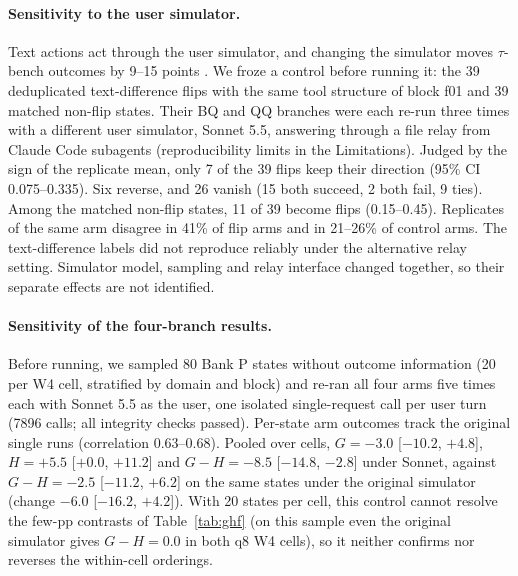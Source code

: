 \paragraph{Sensitivity to the user simulator.} Text actions act through the user simulator, and changing the simulator moves $\tau$-bench outcomes by 9--15 points \citep{seshadri2026lost,jain2026userproxybench}. %
We froze a control before running it: the 39 deduplicated text-difference flips with the same tool structure of block f01 and 39 matched non-flip states. Their BQ and QQ branches were each re-run three times with a different user simulator, Sonnet 5.5, answering through a file relay from Claude Code subagents (reproducibility limits in the Limitations). %
Judged by the sign of the replicate mean, only 7 of the 39 flips keep their direction (95\% CI 0.075--0.335). Six reverse, and 26 vanish (15 both succeed, 2 both fail, 9 ties). Among the matched non-flip states, 11 of 39 become flips (0.15--0.45). Replicates of the same arm disagree in 41\% of flip arms and in 21--26\% of control arms. %
The text-difference labels did not reproduce reliably under the alternative relay setting. Simulator model, sampling and relay interface changed together, so their separate effects are not identified.

\paragraph{Sensitivity of the four-branch results.}
\label{app:simctrlpmain}
Before running, we sampled 80 Bank P states without outcome information (20 per W4 cell, stratified by domain and block) and re-ran all four arms five times each with Sonnet 5.5 as the user, one isolated single-request call per user turn (7896 calls; all integrity checks passed). %
Per-state arm outcomes track the original single runs (correlation 0.63--0.68). Pooled over cells, $G=-3.0$ [$-10.2$, $+4.8$], $H=+5.5$ [$+0.0$, $+11.2$] and $G-H=-8.5$ [$-14.8$, $-2.8$]\pp{} under Sonnet, against $G-H=-2.5$ [$-11.2$, $+6.2$] on the same states under the original simulator (change $-6.0$ [$-16.2$, $+4.2$]). %
With 20 states per cell, this control cannot resolve the few-pp contrasts of Table~\ref{tab:ghf} (on this sample even the original simulator gives $G-H=0.0$ in both q8 W4 cells), so it neither confirms nor reverses the within-cell orderings. %

